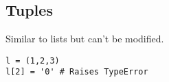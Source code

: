 \subsection{Tuples}
Similar to lists but can't be modified.
\begin{lstlisting}
l = (1,2,3)
l[2] = '0' # Raises TypeError
\end{lstlisting}
